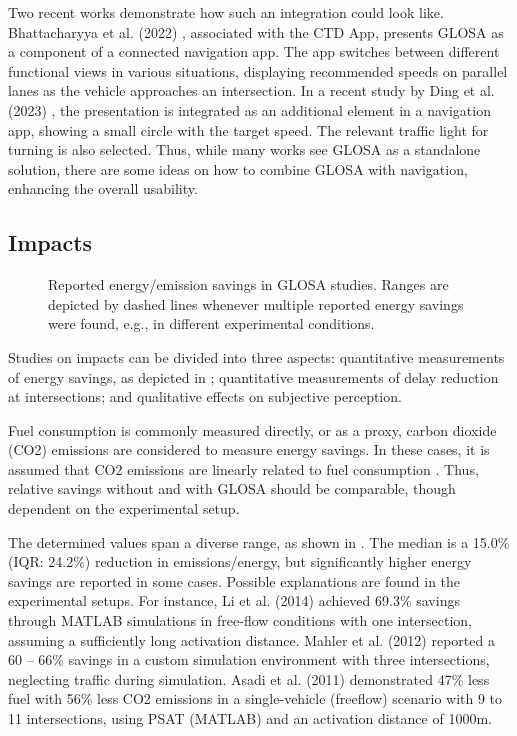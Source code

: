 Two recent works demonstrate how such an integration could look like. Bhattacharyya et al. (2022) \cite{bhattacharyya_assessing_2022}, associated with the CTD App, presents GLOSA as a component of a connected navigation app. The app switches between different functional views in various situations, displaying recommended speeds on parallel lanes as the vehicle approaches an intersection. In a recent study by Ding et al. (2023) \cite{ding_speedadv_2023}, the presentation is integrated as an additional element in a navigation app, showing a small circle with the target speed. The relevant traffic light for turning is also selected. Thus, while many works see GLOSA as a standalone solution, there are some ideas on how to combine GLOSA with navigation, enhancing the overall usability.

\subsection{Impacts}

\begin{figure}
\centering
\resizebox{\linewidth}{!}{%

}
\caption{Reported energy/emission savings in GLOSA studies. Ranges are depicted by dashed lines whenever multiple reported energy savings were found, e.g., in different experimental conditions.}
\label{fig:related-work-energy-savings}
\end{figure}

Studies on impacts can be divided into three aspects: quantitative measurements of energy savings, as depicted in ; quantitative measurements of delay reduction at intersections; and qualitative effects on subjective perception.

Fuel consumption is commonly measured directly, or as a proxy, carbon dioxide (CO2) emissions are considered to measure energy savings. In these cases, it is assumed that CO2 emissions are linearly related to fuel consumption \cite{seredynski_comparison_2013, seredynski_multi-segment_2013}. Thus, relative savings without and with GLOSA should be comparable, though dependent on the experimental setup.

The determined values span a diverse range, as shown in . The median is a 15.0\% (IQR: 24.2\%) reduction in emissions/energy, but significantly higher energy savings are reported in some cases. Possible explanations are found in the experimental setups. For instance, Li et al. (2014) \cite{li_multi-vehicles_2014} achieved 69.3\% savings through MATLAB simulations in free-flow conditions with one intersection, assuming a sufficiently long activation distance. Mahler et al. (2012) \cite{mahler_reducing_2012} reported a 60 -- 66\% savings in a custom simulation environment with three intersections, neglecting traffic during simulation. Asadi et al. (2011) \cite{asadi_predictive_2011} demonstrated 47\% less fuel with 56\% less CO2 emissions in a single-vehicle (freeflow) scenario with 9 to 11 intersections, using PSAT (MATLAB) and an activation distance of 1000m.

